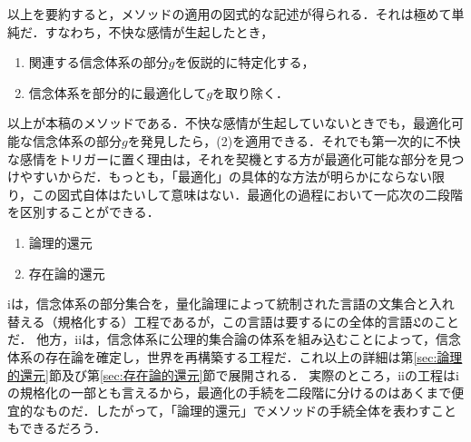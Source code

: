 以上を要約すると，メソッドの適用の図式的な記述が得られる．それは極めて単純だ．すなわち，不快な感情が生起したとき，
\begin{enumerate}[label=(\arabic*)]
    \item 関連する信念体系の部分$g$を仮説的に特定化する，
    \item 信念体系を部分的に最適化して$g$を取り除く．
\end{enumerate}
以上が本稿のメソッドである．不快な感情が生起していないときでも，最適化可能な信念体系の部分$g$を発見したら，(2)を適用できる．それでも第一次的に不快な感情をトリガーに置く理由は，それを契機とする方が最適化可能な部分を見つけやすいからだ．もっとも，「最適化」の具体的な方法が明らかにならない限り，この図式自体はたいして意味はない．最適化の過程において一応次の二段階を区別することができる．
\begin{enumerate}[label=\roman*.]
    \item 論理的還元
    \item 存在論的還元
\end{enumerate}
iは，信念体系の部分集合を，量化論理によって統制された言語の文集合と入れ替える（規格化する）工程であるが，この言語は要するにの全体的言語$\mathfrak{L}$のことだ．
他方，iiは，信念体系に公理的集合論の体系を組み込むことによって，信念体系の存在論を確定し，世界を再構築する工程だ．これ以上の詳細は第\ref{sec:論理的還元}節及び第\ref{sec:存在論的還元}節で展開される．
実際のところ，iiの工程はiの規格化の一部とも言えるから，最適化の手続を二段階に分けるのはあくまで便宜的なものだ．したがって，「論理的還元」でメソッドの手続全体を表わすこともできるだろう．